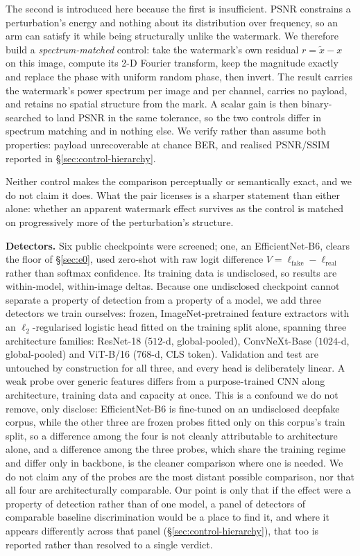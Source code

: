 \documentclass[journal]{IEEEtran}
\begin{document}
The second is introduced here because the first is insufficient. PSNR
constrains a perturbation's energy and nothing about its distribution over
frequency, so an arm can satisfy it while being structurally unlike the
watermark. We therefore build a \emph{spectrum-matched} control: take the
watermark's own residual $r = \tilde{x} - x$ on this image, compute its 2-D
Fourier transform, keep the magnitude exactly and replace the phase with
uniform random phase, then invert. The result carries the watermark's power
spectrum per image and per channel, carries no payload, and retains no spatial
structure from the mark. A scalar gain is then binary-searched to land PSNR in
the same tolerance, so the two controls differ in spectrum matching and in
nothing else. We verify rather than assume both properties: payload
unrecoverable at chance BER, and realised PSNR/SSIM reported in
\S\ref{sec:control-hierarchy}.

Neither control makes the comparison perceptually or semantically exact, and
we do not claim it does. What the pair licenses is a sharper statement than
either alone: whether an apparent watermark effect survives as the control is
matched on progressively more of the perturbation's structure.

\textbf{Detectors.} Six public checkpoints were screened; one, an
EfficientNet-B6, clears the floor of \S\ref{sec:e0}, used zero-shot with raw
logit difference $V=\ell_{\text{fake}}-\ell_{\text{real}}$ rather than softmax
confidence. Its training data is undisclosed, so results are within-model,
within-image deltas. Because one undisclosed checkpoint cannot separate a
property of detection from a property of a model, we add three detectors we
train ourselves: frozen, ImageNet-pretrained feature extractors with an
$\ell_2$-regularised logistic head fitted on the training split alone,
spanning three architecture families: ResNet-18 ($512$-d, global-pooled),
ConvNeXt-Base ($1024$-d, global-pooled) and ViT-B/16 ($768$-d, CLS token).
Validation and test are untouched by construction for all three, and every
head is deliberately linear. A weak probe over generic features differs from
a purpose-trained CNN along architecture, training data and capacity at once.
This is a confound we do not remove, only disclose: EfficientNet-B6 is
fine-tuned on an undisclosed deepfake corpus, while the other three are frozen
probes fitted only on this corpus's train split, so a difference among the
four is not cleanly attributable to architecture alone, and a difference among
the three probes, which share the training regime and differ only in
backbone, is the cleaner comparison where one is needed. We do not claim any
of the probes are the most distant possible comparison, nor that all four are
architecturally comparable. Our point is only that if the effect were a
property of detection rather than of one model, a panel of detectors of
comparable baseline discrimination would be a place to find it, and where it
appears differently across that panel (\S\ref{sec:control-hierarchy}), that
too is reported rather than resolved to a single verdict.
\end{document}
